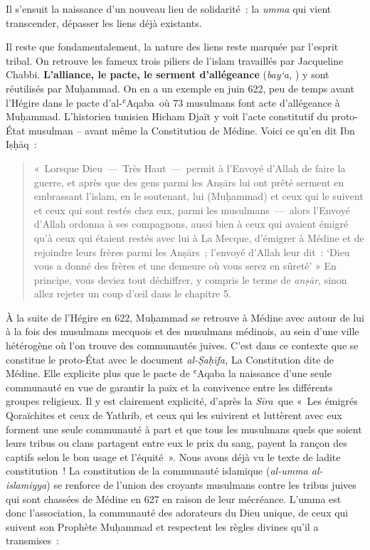 Il s'ensuit la naissance d'un nouveau lieu de solidarité~: la
\emph{umma} qui vient transcender, dépasser les liens déjà existants.

Il reste que fondamentalement, la nature des liens reste marquée par
l'esprit tribal. On retrouve les fameux trois piliers de l'islam
travaillés par Jacqueline Chabbi. \textbf{L'alliance, le pacte, le
serment d'allégeance} (\emph{bay`a,} ‎‎) y sont réutilisés
par Muḥammad. On en a un exemple en juin 622, peu de temps avant
l'Hégire dans le pacte d'al-ʿAqaba~où 73 musulmans font acte
d'allégeance à Muḥammad. L'historien tunisien Hicham Djaït y voit l'acte
constitutif du proto-État musulman -- avant même la Constitution de
Médine. Voici ce qu'en dit Ibn Iṣḥāq~:

\begin{quote}
«~Lorsque Dieu~---~Très Haut~---~permit à l'Envoyé d'Allah de faire la
guerre, et après que des gens parmi les Anṣārs lui ont prêté serment en
embrassant l'islam, en le soutenant, lui (Muḥammad) et ceux qui le
suivent et ceux qui sont restés chez eux, parmi les musulmans~---~alors
l'Envoyé d'Allah ordonna à ses compagnons, aussi bien à ceux qui avaient
émigré qu'à ceux qui étaient restés avec lui à La Mecque, d'émigrer à
Médine et de rejoindre leurs frères parmi les Anṣārs~; l'envoyé d'Allah
leur dit~: `Dieu vous a donné des frères et une demeure où vous serez en
sûreté' » En principe, vous deviez tout
déchiffrer, y compris le terme de \emph{anṣār}, sinon allez rejeter un
coup d'œil dans le chapitre 5.
\end{quote}

À la suite de l'Hégire en 622, Muḥammad se retrouve à Médine avec autour
de lui à la fois des musulmans mecquois et des musulmans médinois, au
sein d'une ville hétérogène où l'on trouve des communautés juives. C'est
dans ce contexte que se constitue le proto-État avec le document
\emph{al-Ṣaḥīfa,} La Constitution dite de Médine. Elle explicite plus
que le pacte de ʿAqaba la naissance d'une seule communauté en vue de
garantir la paix et la convivence entre les différents groupes
religieux. Il y est clairement explicité, d'après la \emph{Sīra}~que
«~Les émigrés Qoraïchites et ceux de Yathrib, et ceux qui les suivirent
et luttèrent avec eux forment une seule communauté à part et que tous
les musulmans quels que soient leurs tribus ou clans partagent entre eux
le prix du sang, payent la rançon des captifs selon le bon usage et
l'équité~». Nous avons déjà vu le texte de ladite constitution~! La
constitution de la communauté islamique (\emph{al-umma al-islamiyya}) se
renforce de l'union des croyants musulmans contre les tribus juives qui
sont chassées de Médine en 627 en raison de leur mécréance. L'umma est
donc l'association, la communauté des adorateurs du Dieu unique, de ceux
qui suivent son Prophète Muḥammad et respectent les règles divines qu'il
a transmises~:

